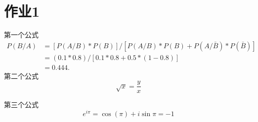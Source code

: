 \documentclass[11pt,UTF8]{ctexbook}
\begin{document}
\fi

\section{作业1}
第一个公式
\begin{align*}
P(B/A)&=[P(A/B)*P(B)]/[P(A/B)*P(B)+P(A/\bar{B})*P(\bar{B})] \nonumber \\
      &=(0.1*0.8)/[0.1*0.8+0.5*(1-0.8)] \nonumber \\
      &=0.444.
\end{align*} 
第二个公式
\begin{equation}
\sqrt{x}=\frac{y}{x}
\end{equation}

第三个公式
\[e^{i\pi}=\cos(\pi)+i\sin\pi=-1\]


\date{\today}


\ifx\allfiles\undefined
\end{document}

